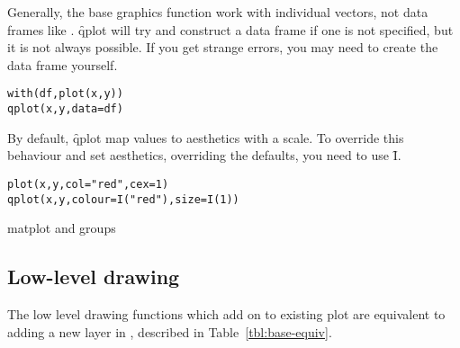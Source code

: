 
Generally, the base graphics function work with individual vectors, not data frames like \ggplot.  \f{qplot} will try and construct a data frame if one is not specified, but it is not always possible.  If you get strange errors, you may need to create the data frame yourself.

\begin{alltt}
with(df, plot(x, y))
qplot(x, y, data = df)
\end{alltt}

By default, \f{qplot} map values to aesthetics with a scale.  To override this behaviour and set aesthetics, overriding the defaults, you need to use \f{I}.

\begin{alltt}
plot(x, y, col = "red", cex = 1)
qplot(x, y, colour = I("red"), size = I(1))
\end{alltt}

matplot and groups

\subsection{Low-level drawing}

The low level drawing functions which add on to existing plot are equivalent to adding a new layer in \ggplot, described in Table~\ref{tbl:base-equiv}.

